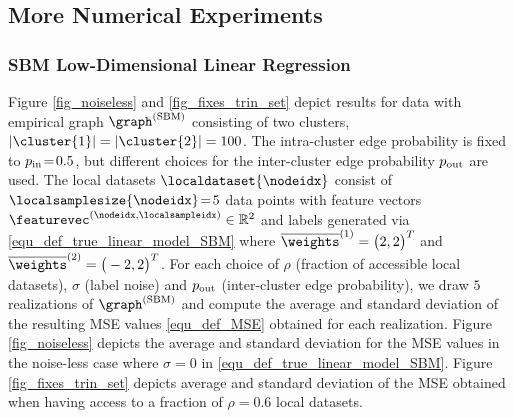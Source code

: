 \documentclass[lettersize,journal]{IEEEtran}
\begin{document}
\subsection{More Numerical Experiments}
\label{sec_more_numexp}


\subsubsection{SBM Low-Dimensional Linear Regression}

Figure \ref{fig_noiseless} and \ref{fig_fixes_trin_set} depict results for data with empirical graph $\graph^{(\rm SBM)}$ 
consisting of two clusters, $|\cluster{1}| = |\cluster{2}| = 100$. The intra-cluster edge probability is fixed to 
$p_{\rm in}\!=\!0.5$, but different choices for the inter-cluster edge probability $p_{\rm out}$ are used. The local 
datasets $\localdataset{\nodeidx}$ consist of $\localsamplesize{\nodeidx}\!=\!5$ data points with feature vectors 
$\featurevec^{(\nodeidx,\localsampleidx)} \in \mathbb{R}^{2}$ and labels generated via \eqref{equ_def_true_linear_model_SBM} 
where $\overline{\weights}^{(1)} = \big(2, 2\big)^T$ and $\overline{\weights}^{(2)} = \big(-2, 2\big)^T$. 
For each choice of $\rho$ (fraction of accessible local datasets), $\sigma$ (label noise) and $p_{\rm out}$ (inter-cluster edge probability), 
we draw $5$ realizations of $\graph^{(\rm SBM)}$ and compute the average and standard deviation of the resulting MSE values 
\eqref{equ_def_MSE} obtained for each realization. Figure \ref{fig_noiseless} depicts the average and standard deviation 
for the MSE values in the noise-less case where $\sigma=0$ in \eqref{equ_def_true_linear_model_SBM}. Figure \ref{fig_fixes_trin_set} 
depicts average and standard deviation of the MSE obtained when having access to a fraction of $\rho=0.6$ local datasets. 
\end{document}
